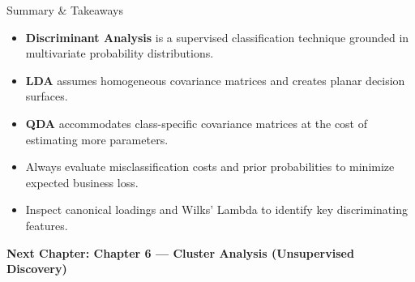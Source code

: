 \documentclass[aspectratio=169,ignorenonframetext]{beamer}
\begin{document}
\begin{frame}{Summary \& Takeaways}
\begin{itemize}
\item
  \textbf{Discriminant Analysis} is a supervised classification
  technique grounded in multivariate probability distributions.
\item
  \textbf{LDA} assumes homogeneous covariance matrices and creates
  planar decision surfaces.
\item
  \textbf{QDA} accommodates class-specific covariance matrices at the
  cost of estimating more parameters.
\item
  Always evaluate misclassification costs and prior probabilities to
  minimize expected business loss.
\item
  Inspect canonical loadings and Wilks' Lambda to identify key
  discriminating features.
\end{itemize}

{ \textbf{Next Chapter: Chapter 6 --- Cluster Analysis (Unsupervised
Discovery)} }
\end{frame}
\end{document}
